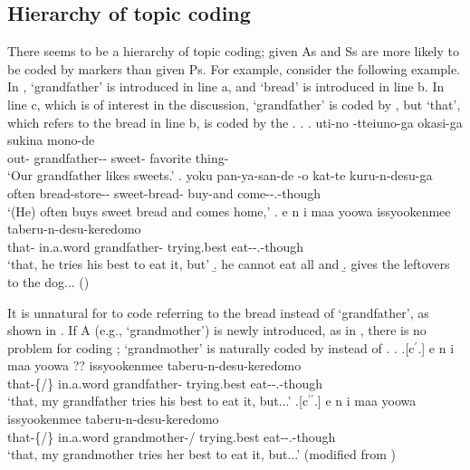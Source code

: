 
\subsection{Hierarchy of topic coding}\label{Par:ArgStr:TopHierarchy}

There seems to be a hierarchy of topic coding;
given As and Ss are more likely to be coded by  markers than given Ps.
For example, consider the following example.
In \Next,
 `grandfather' is introduced in line a, and
 `bread' is introduced in line b.
In line c, which is of interest in the discussion,
 `grandfather' is coded by , but
 `that', which refers to the bread in line b, is coded by the  .
%
\ex.
 \ag. uti-no -tteiuno-ga okasi-ga sukina mono-de \\
 		out- grandfather-- sweet- favorite thing- \\
		`Our grandfather likes sweets.'
 \bg. yoku pan-ya-san-de -o kat-te kuru-n-desu-ga \\
   often bread-store-- sweet-bread- buy-and come--.-though \\
   `(He) often buys sweet bread and comes home,'
 \bg. e n  i maa yoowa  issyookenmee taberu-n-desu-keredomo \\
     that-   in.a.word grandfather- trying.best eat--.-though \\
   `that, he tries his best to eat it, but'
 \b. he cannot eat all and
 \b. gives the leftovers to the dog...
  \hfill{()}

It is unnatural for  to code  referring to the bread
instead of  `grandfather',
as shown in \Next[c$^{\prime}$].
If A (e.g.,  `grandmother') is newly introduced, as in ,
there is no problem for  coding ;
 `grandmother' is naturally coded by  instead of .
%
\ex.
 \ag.[c$^{\prime}$.] e n  i maa yoowa ?? issyookenmee taberu-n-desu-keredomo \\
     that-\{/\}   in.a.word grandfather- trying.best eat--.-though \\
   `that, my grandfather tries his best to eat it, but...'
  \bg.[c$^{\prime\prime}$.] e n  i maa yoowa  issyookenmee taberu-n-desu-keredomo \\
     that-\{/\}   in.a.word grandmother-/ trying.best eat--.-though \\
   `that, my grandmother tries her best to eat it, but...'
   \hfill{(modified from \Last[c])}

